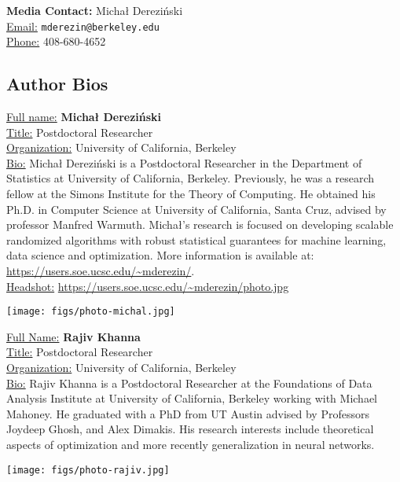 \documentclass[11pt, oneside]{article}   	%
\begin{document}
\noindent
\textbf{Media Contact:}
Micha{\l} Derezi\'nski\\
\underline{Email:} \texttt{mderezin@berkeley.edu}\\
\underline{Phone:} 408-680-4652
\subsection*{Author Bios} 
\begin{minipage}{.7\textwidth}
  \underline{Full name:} \textbf{Micha{\l} Derezi\'nski}\\
\underline{Title:} Postdoctoral Researcher\\
\underline{Organization:} University of California, Berkeley\\
\underline{Bio:} Michał Dereziński is a Postdoctoral Researcher in the
Department of Statistics at University of California,
Berkeley. Previously, he was a research fellow at the Simons Institute
for the Theory of Computing. He obtained his Ph.D. in Computer Science
at University of California, Santa Cruz, advised by professor Manfred
Warmuth. Michał's research is focused on developing scalable
randomized algorithms with robust statistical guarantees for machine
learning, data science and optimization. More information is available
at: \url{https://users.soe.ucsc.edu/~mderezin/}.\\
\underline{Headshot:} \url{https://users.soe.ucsc.edu/~mderezin/photo.jpg}
\end{minipage}\hfill
\begin{minipage}{.25\textwidth}
  \texttt{[image: figs/photo-michal.jpg]}
\end{minipage}
\vspace{5mm}

\noindent
\begin{minipage}{.7\textwidth}
\underline{Full Name:} \textbf{Rajiv Khanna}\\
\underline{Title:} Postdoctoral Researcher\\
\underline{Organization:} University of California, Berkeley\\
\underline{Bio:} Rajiv Khanna is a Postdoctoral Researcher at the
Foundations of Data Analysis Institute at University of California,
Berkeley working with Michael Mahoney. He graduated with a PhD from UT
Austin advised by Professors Joydeep Ghosh, and Alex Dimakis.  His
research interests include theoretical aspects of optimization and
more recently generalization in neural networks.
\end{minipage}
\hfill
\begin{minipage}{.25\textwidth}
  \texttt{[image: figs/photo-rajiv.jpg]}
\end{minipage}
\vspace{5mm}
\end{document}
